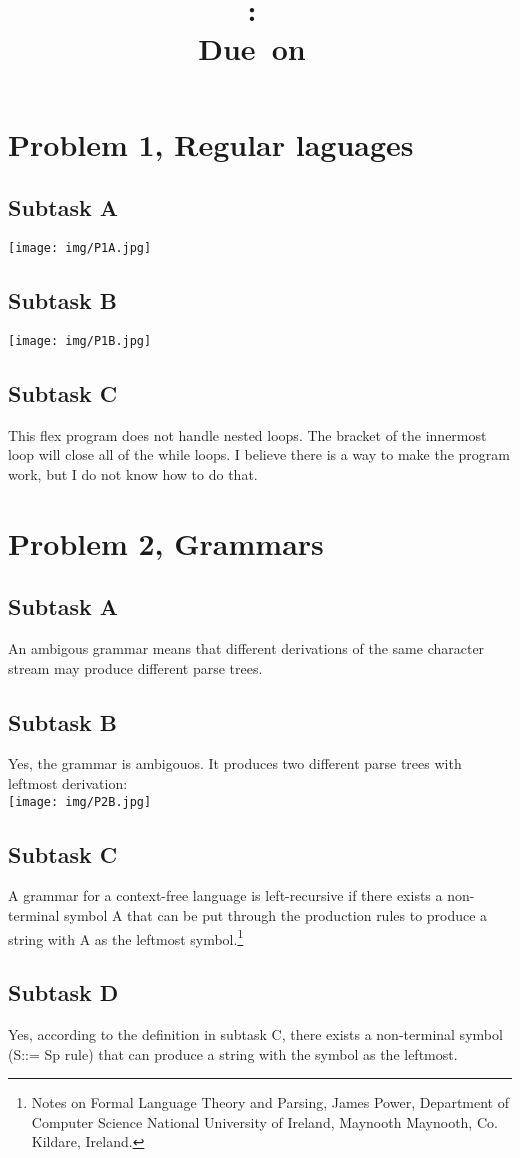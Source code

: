 \documentclass{article}
\title{
\vspace{2in}
\textmd{\textbf{\hmwkClass:\ \hmwkTitle}}\\
\normalsize\vspace{0.1in}\small{Due\ on\ \hmwkDueDate}\\
\vspace{3in}
}
\author{\textbf{\hmwkAuthorName}}
\date{} %
\begin{document}
\maketitle
\newpage

\section{Problem 1, Regular laguages}
\subsection{Subtask A}
\texttt{[image: img/P1A.jpg]} %

\subsection{Subtask B}
\texttt{[image: img/P1B.jpg]} %

\subsection{Subtask C}
This flex program does not handle nested loops. The bracket of the innermost loop will close all of the while loops. I believe there is a way to make the program work, but I do not know how to do that.

\section{Problem 2, Grammars}
\subsection{Subtask A}
An ambigous grammar means that different derivations of the same character stream may produce different parse trees.

\subsection{Subtask B}
Yes, the grammar is ambigouos. It produces two different parse trees with leftmost derivation:\\
\texttt{[image: img/P2B.jpg]} %

\subsection{Subtask C}
\label{subsec:p2c}
A grammar for a context-free language is left-recursive if there exists a non-terminal symbol A that can be put through the production rules to produce a string with A as the leftmost symbol.\footnote{Notes on Formal Language Theory and Parsing, James Power, Department of Computer Science National University of Ireland, Maynooth Maynooth, Co. Kildare, Ireland.}

\subsection{Subtask D}
Yes, according to the definition in subtask C, there exists a non-terminal symbol (S::= Sp rule) that can produce a string with the symbol as the leftmost.
\end{document}
